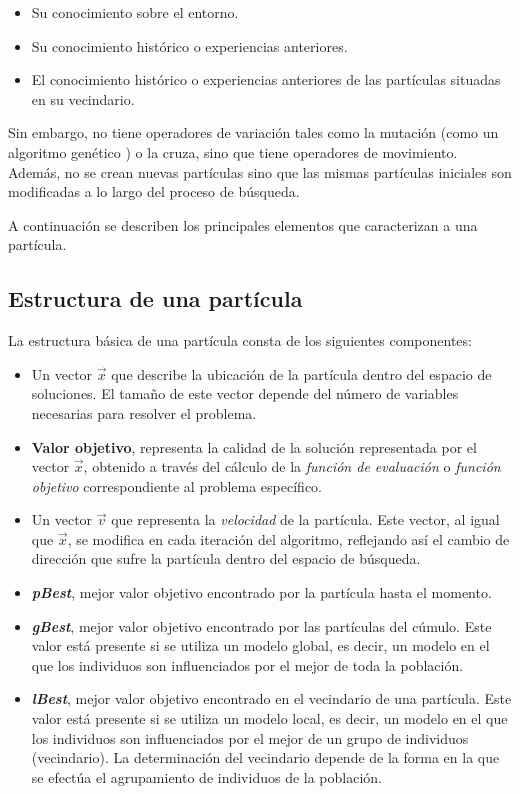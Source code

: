  \begin{itemize}
   \item Su conocimiento sobre el entorno. 
   \item Su conocimiento hist\'orico o experiencias anteriores.
   \item El conocimiento hist\'orico o experiencias anteriores de las part\'iculas situadas en su vecindario.
  \end{itemize}
  
  Sin embargo, no tiene operadores de variaci\'on tales como la mutaci\'on (como un algoritmo gen\'etico \cite{YanNSA}) o la cruza, sino que tiene 
  operadores de movimiento. Adem\'as, no se crean nuevas part\'iculas sino que las mismas part\'iculas iniciales son modificadas a 
  lo largo del proceso de b\'usqueda. 
   
  A continuaci\'on se describen los principales elementos que caracterizan a una part\'icula.
    
    \subsection{Estructura de una part\'icula}
   
  La estructura b\'asica de una part\'icula consta de los siguientes componentes:
  
  \begin{itemize}
   \item Un vector $\vec{x}$ que describe la ubicaci\'on de la part\'icula dentro del espacio de soluciones. El tama\~no de este vector 
   depende del n\'umero de variables necesarias para resolver el problema.
   \item \textbf{Valor objetivo}, representa la calidad de la soluci\'on representada por el vector $\vec{x}$, obtenido a trav\'es del c\'alculo 
   de la \textit{funci\'on de evaluaci\'on} o \textit{funci\'on objetivo} correspondiente al problema espec\'ifico.
   \item Un vector $\vec{v}$ que representa la \textit{velocidad} de la part\'icula. Este vector, al igual que $\vec{x}$, se modifica en cada 
   iteraci\'on del algoritmo, reflejando as\'i el cambio de direcci\'on que sufre la part\'icula  dentro del espacio de b\'usqueda.
   \item \textbf{\textit{pBest}}, mejor valor objetivo encontrado por la part\'icula hasta el momento. 
   \item \textbf{\textit{gBest}}, mejor valor objetivo encontrado por las part\'iculas del c\'umulo. Este valor est\'a presente si se 
   utiliza un modelo global, es decir, un modelo en el que los individuos son influenciados por el mejor de toda la poblaci\'on.
   \item \textbf{\textit{lBest}}, mejor valor objetivo encontrado en el vecindario de una part\'icula. Este valor est\'a presente si se 
   utiliza un modelo local, es decir, un modelo en el que los individuos son influenciados por el mejor de un grupo de individuos 
   (vecindario). La determinaci\'on del vecindario depende de la forma en la que se efect\'ua el agrupamiento de individuos de la poblaci\'on.
  \end{itemize}
 
